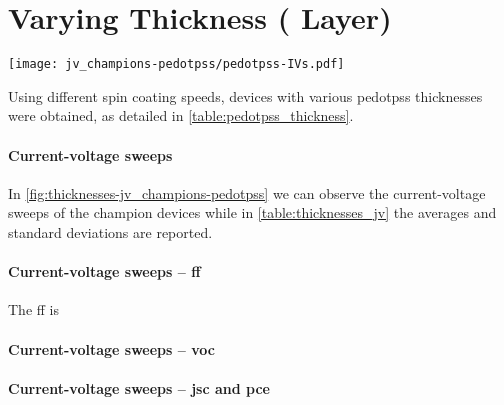 \section{Varying  Thickness ( Layer)}

\begin{SCfigure}
	\centering
	\texttt{[image: jv\_champions-pedotpss/pedotpss-IVs.pdf]}
	\label{fig:thicknesses-jv_champions-pedotpss}
\end{SCfigure}

Using different spin coating speeds, devices with various \gls{pedotpss} thicknesses were obtained, as detailed in \cref{table:pedotpss_thickness}.

\paragraph{Current-voltage sweeps}
In \cref{fig:thicknesses-jv_champions-pedotpss} we can observe the current-voltage sweeps of the champion devices while in \cref{table:thicknesses_jv} the averages and standard deviations are reported.

\paragraph{Current-voltage sweeps -- \gls{ff}}
The \gls{ff} is 

\paragraph{Current-voltage sweeps -- \gls{voc}}

\paragraph{Current-voltage sweeps -- \gls{jsc} and \gls{pce}}




